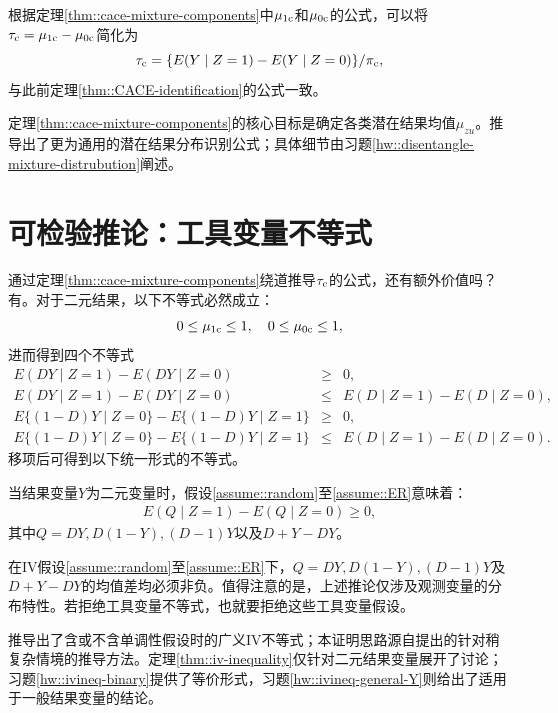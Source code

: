 根据定理\ref{thm::cace-mixture-components}中$\mu_{1\textup{c}} $和$\mu_{0\textup{c}} $的公式，可以将$\tau_{\textup{c}} = \mu_{1\textup{c}}  - \mu_{0\textup{c}}  $简化为$$
\tau_{\textup{c}} =  \{  E(Y\mid Z=1) - E(Y\mid Z=0) \}/\pi_{\textup{c}} ,
$$与此前定理\ref{thm::CACE-identification}的公式一致。 

定理\ref{thm::cace-mixture-components}的核心目标是确定各类潜在结果均值$\mu_{zu} $。\citet{imbens1997estimating}推导出了更为通用的潜在结果分布识别公式；具体细节由习题\ref{hw::disentangle-mixture-distrubution}阐述。



\section{可检验推论：工具变量不等式}


通过定理\ref{thm::cace-mixture-components}绕道推导$\tau_{\textup{c}}$的公式，还有额外价值吗？有。对于二元结果，以下不等式必然成立：$$
0\leq \mu_{1\textup{c}} \leq 1, \quad 
0\leq \mu_{0\textup{c}} \leq 1, 
$$进而得到四个不等式\begin{eqnarray*}
E(DY\mid Z=1 )  -  E(DY\mid Z=0) &\geq & 0 ,\\
E(DY\mid Z=1 )  -  E(DY\mid Z=0) &\leq  & E(D\mid Z=1) - E(D\mid Z=0)  ,\\ 
E\{ (1-D)Y\mid Z=0 \}  -  E\{(1-D)Y\mid Z=1 \}   &\geq & 0,\\
E\{ (1-D)Y\mid Z=0 \}  -  E\{(1-D)Y\mid Z=1 \}  &\leq & E(D\mid Z=1) - E(D\mid Z=0) . 
\end{eqnarray*}移项后可得到以下统一形式的不等式。


\begin{theorem}[工具变量不等式]\label{thm::iv-inequality}
当结果变量$Y$为二元变量时，假设\ref{assume::random}至\ref{assume::ER}意味着：
\begin{eqnarray}\label{eq::iv-inequalities}
E(Q\mid Z=1) - E(Q\mid Z=0) \geq 0,  
\end{eqnarray}
其中$Q = DY, D(1-Y), (D - 1)Y$以及$D+Y-DY$。
\end{theorem}


在IV假设\ref{assume::random}至\ref{assume::ER}下，$Q = DY, D(1-Y), (D - 1)Y$及$D+Y-DY$的均值差均必须非负。值得注意的是，上述推论仅涉及观测变量的分布特性。若拒绝工具变量不等式，也就要拒绝这些工具变量假设。


\citet{balke1997bounds}推导出了含或不含单调性假设时的广义IV不等式；本证明思路源自\citet{jiang2020measurement}提出的针对稍复杂情境的推导方法。定理\ref{thm::iv-inequality}仅针对二元结果变量展开了讨论；习题\ref{hw::ivineq-binary}提供了等价形式，习题\ref{hw::ivineq-general-Y}则给出了适用于一般结果变量的结论。



